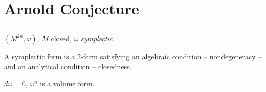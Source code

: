 \section{Arnold Conjecture}

\subsection{} %

$(M^{2n}, \omega)$, $M$ closed, $\omega$ \emph{symplectic}.

\begin{framed}
    A symplectic form is a $2$-form satisfying an algebraic condition --
    nondegeneracy -- and an analytical condition -- closedness.

    $d\omega=0$, $\omega^n$ is a volume form.
\end{framed}
